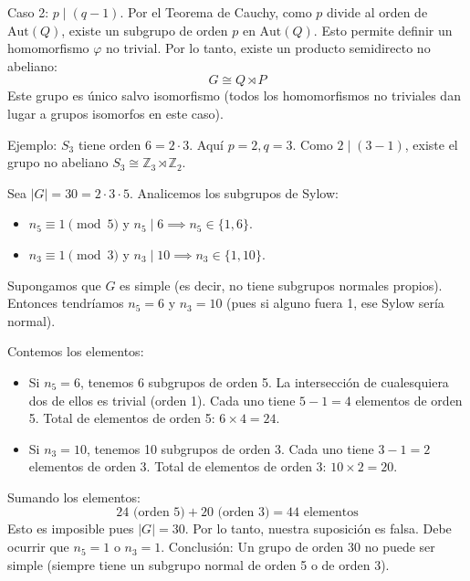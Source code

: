 \begin{eje}
    Caso 2: $p \mid (q-1)$.
    Por el Teorema de Cauchy, como $p$ divide al orden de $\text{Aut}(Q)$, existe un subgrupo de orden $p$ en $\text{Aut}(Q)$.
    Esto permite definir un homomorfismo $\varphi$ no trivial.
    Por lo tanto, existe un producto semidirecto no abeliano:
    \begin{equation*}
        G \cong Q \rtimes P
    \end{equation*}
    Este grupo es único salvo isomorfismo (todos los homomorfismos no triviales dan lugar a grupos isomorfos en este caso). \par 
    Ejemplo: $S_3$ tiene orden $6 = 2 \cdot 3$. Aquí $p=2, q=3$. Como $2 \mid (3-1)$, existe el grupo no abeliano $S_3 \cong \mathbb{Z}_3 \rtimes \mathbb{Z}_2$.
\end{eje}

\begin{eje}
    Sea $|G| = 30 = 2 \cdot 3 \cdot 5$.
    Analicemos los subgrupos de Sylow:
    \begin{itemize}
        \item $n_5 \equiv 1 \pmod 5$ y $n_5 \mid 6 \implies n_5 \in \{1, 6\}$.
        \item $n_3 \equiv 1 \pmod 3$ y $n_3 \mid 10 \implies n_3 \in \{1, 10\}$.
    \end{itemize}
    Supongamos que $G$ es simple (es decir, no tiene subgrupos normales propios).
    Entonces tendríamos $n_5 = 6$ y $n_3 = 10$ (pues si alguno fuera 1, ese Sylow sería normal).
    
    Contemos los elementos:
    \begin{itemize}
        \item Si $n_5 = 6$, tenemos 6 subgrupos de orden 5. La intersección de cualesquiera dos de ellos es trivial (orden 1).
        Cada uno tiene $5-1 = 4$ elementos de orden 5.
        Total de elementos de orden 5: $6 \times 4 = 24$.
        \item Si $n_3 = 10$, tenemos 10 subgrupos de orden 3.
        Cada uno tiene $3-1 = 2$ elementos de orden 3.
        Total de elementos de orden 3: $10 \times 2 = 20$.
    \end{itemize}
    Sumando los elementos:
    \begin{equation*}
        24 \text{ (orden 5)} + 20 \text{ (orden 3)} = 44 \text{ elementos}
    \end{equation*}
    Esto es imposible pues $|G| = 30$.
    Por lo tanto, nuestra suposición es falsa. Debe ocurrir que $n_5 = 1$ o $n_3 = 1$.
    Conclusión: Un grupo de orden 30 no puede ser simple (siempre tiene un subgrupo normal de orden 5 o de orden 3).
\end{eje}

